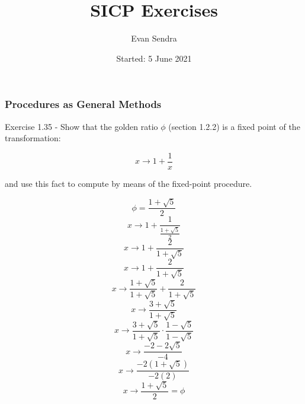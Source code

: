\documentclass{article}
\title{SICP Exercises}
\author{Evan Sendra}
\date{Started: 5 June 2021}
\begin{document}
\maketitle
\newpage


\section{}
\subsection{}
\subsection{}
\subsection{}
  \subsubsection{}
  \subsubsection{}
  \subsubsection{Procedures as General Methods}
  Exercise 1.35 - Show that the golden ratio $\phi$ (section 1.2.2) is a fixed point of the transformation:
  
  \[x \rightarrow 1 + \frac{1}{x}\]
  
  and use this fact to compute  by means of the fixed-point procedure.

	\newcommand{\pe}{\frac{1 + \sqrt{5}}{2}}

	\[\phi = \pe\]
  \[x \rightarrow 1 + \frac{1}{\pe}\]
  \[x \rightarrow 1 + \frac{2}{1+\sqrt{5}}\]
  \[x \rightarrow 1 + \frac{2}{1+\sqrt{5}}\]
  \[x \rightarrow \frac{1+\sqrt{5}}{1+\sqrt{5}} + \frac{2}{1+\sqrt{5}}\]
  \[x \rightarrow \frac{3+\sqrt{5}}{1+\sqrt{5}}\]
  \[x \rightarrow \frac{3+\sqrt{5}}{1+\sqrt{5}} \cdot \frac{1-\sqrt{5}}{1-\sqrt{5}}\]
  \[x \rightarrow \frac{-2-2\sqrt{5}}{-4}\]
  \[x \rightarrow \frac{-2(1+\sqrt{5})}{-2(2)}\]
  \[x \rightarrow \pe = \phi\]
\end{document}
